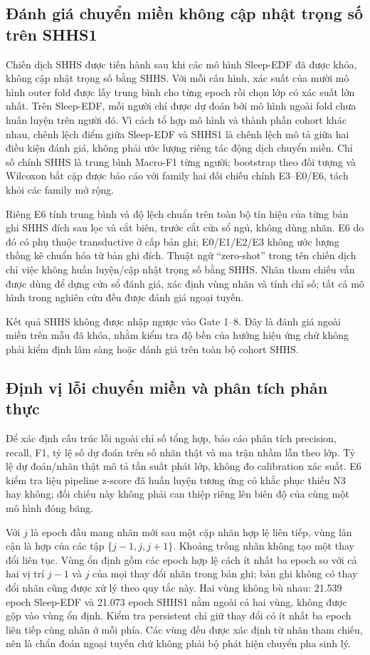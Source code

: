 \subsection{Đánh giá chuyển miền không cập nhật trọng số trên SHHS1}

Chiến dịch SHHS được tiến hành sau khi các mô hình Sleep-EDF đã được khóa, không cập nhật trọng số bằng SHHS. Với mỗi cấu hình, xác suất của mười mô hình outer fold được lấy trung bình cho từng epoch rồi chọn lớp có xác suất lớn nhất. Trên Sleep-EDF, mỗi người chỉ được dự đoán bởi mô hình ngoài fold chưa huấn luyện trên người đó. Vì cách tổ hợp mô hình và thành phần cohort khác nhau, chênh lệch điểm giữa Sleep-EDF và SHHS1 là chênh lệch mô tả giữa hai điều kiện đánh giá, không phải ước lượng riêng tác động dịch chuyển miền. Chỉ số chính SHHS là trung bình Macro-F1 từng người; bootstrap theo đối tượng và Wilcoxon bắt cặp được báo cáo với family hai đối chiếu chính E3--E0/E6, tách khỏi các family mở rộng.

Riêng E6 tính trung bình và độ lệch chuẩn trên toàn bộ tín hiệu của từng bản ghi SHHS đích sau lọc và cắt biên, trước cắt cửa sổ ngủ, không dùng nhãn. E6 do đó có phụ thuộc transductive ở cấp bản ghi; E0/E1/E2/E3 không ước lượng thống kê chuẩn hóa từ bản ghi đích. Thuật ngữ ``zero-shot'' trong tên chiến dịch chỉ việc không huấn luyện/cập nhật trọng số bằng SHHS. Nhãn tham chiếu vẫn được dùng để dựng cửa sổ đánh giá, xác định vùng nhãn và tính chỉ số; tất cả mô hình trong nghiên cứu đều được đánh giá ngoại tuyến.

Kết quả SHHS không được nhập ngược vào Gate 1--8. Đây là đánh giá ngoài miền trên mẫu đã khóa, nhằm kiểm tra độ bền của hướng hiệu ứng chứ không phải kiểm định lâm sàng hoặc đánh giá trên toàn bộ cohort SHHS.

\subsection{Định vị lỗi chuyển miền và phân tích phản thực}

Để xác định cấu trúc lỗi ngoài chỉ số tổng hợp, báo cáo phân tích precision, recall, F1, tỷ lệ số dự đoán trên số nhãn thật và ma trận nhầm lẫn theo lớp. Tỷ lệ dự đoán/nhãn thật mô tả tần suất phát lớp, không đo calibration xác suất. E6 kiểm tra liệu pipeline z-score đã huấn luyện tương ứng có khắc phục thiếu N3 hay không; đối chiếu này không phải can thiệp riêng lên biên độ của cùng một mô hình đóng băng.

Với $j$ là epoch đầu mang nhãn mới sau một cặp nhãn hợp lệ liên tiếp, vùng lân cận là hợp của các tập $\{j-1,j,j+1\}$. Khoảng trống nhãn không tạo một thay đổi liên tục. Vùng ổn định gồm các epoch hợp lệ cách ít nhất ba epoch so với cả hai vị trí $j-1$ và $j$ của mọi thay đổi nhãn trong bản ghi; bản ghi không có thay đổi nhãn cũng được xử lý theo quy tắc này. Hai vùng không bù nhau: 21.539 epoch Sleep-EDF và 21.073 epoch SHHS1 nằm ngoài cả hai vùng, không được gộp vào vùng ổn định. Kiểm tra persistent chỉ giữ thay đổi có ít nhất ba epoch liên tiếp cùng nhãn ở mỗi phía. Các vùng đều được xác định từ nhãn tham chiếu, nên là chẩn đoán ngoại tuyến chứ không phải bộ phát hiện chuyển pha sinh lý.

